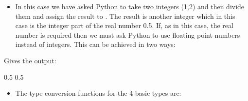 \documentclass[letterpaper,10pt,english,openany]{sphinxmanual}
\begin{document}
\begin{sphinxVerbatim}[commandchars=\\\{\}]
  
    
\end{sphinxVerbatim}
\begin{itemize}
\item {} 
In this case we have asked Python to take two integers (1,2) and then
divide them and assign the result to . The result is another
integer which in this case is the integer part of the real number
0.5. If, as in this case, the real number is required then we must
ask Python to use floating point numbers instead of integers. This
can be achieved in two ways:

\end{itemize}

\begin{sphinxVerbatim}[commandchars=\\\{\}]
  

  
  
\end{sphinxVerbatim}

Gives the output:

\begin{sphinxVerbatim}[commandchars=\\\{\}]
0.5
0.5
\end{sphinxVerbatim}
\begin{itemize}
\item {} 
The type conversion functions for the 4 basic types are:

\end{itemize}
\end{document}
